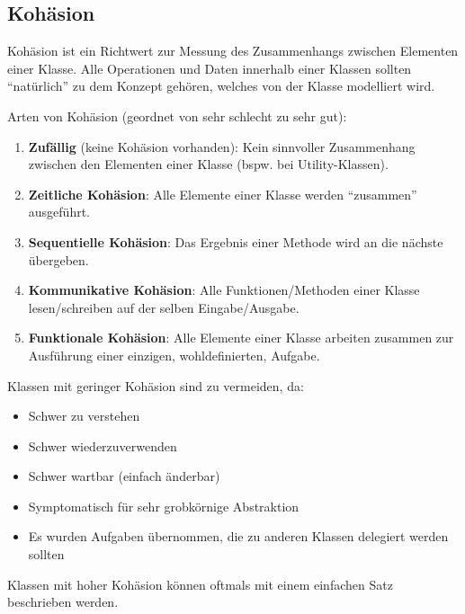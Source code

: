 

		\subsection{Kohäsion}
			Kohäsion ist ein Richtwert zur Messung des Zusammenhangs zwischen Elementen einer Klasse. Alle Operationen und Daten innerhalb einer Klassen sollten \enquote{natürlich} zu dem Konzept gehören, welches von der Klasse modelliert wird.

			Arten von Kohäsion (geordnet von sehr schlecht zu sehr gut):
			\begin{enumerate}
				\item \textbf{Zufällig} (keine Kohäsion vorhanden): Kein sinnvoller Zusammenhang zwischen den Elementen einer Klasse (bspw. bei Utility-Klassen).
				\item \textbf{Zeitliche Kohäsion}: Alle Elemente einer Klasse werden \enquote{zusammen} ausgeführt.
				\item \textbf{Sequentielle Kohäsion}: Das Ergebnis einer Methode wird an die nächste übergeben.
				\item \textbf{Kommunikative Kohäsion}: Alle Funktionen/Methoden einer Klasse lesen/schreiben auf der selben Eingabe/Ausgabe.
				\item \textbf{Funktionale Kohäsion}: Alle Elemente einer Klasse arbeiten zusammen zur Ausführung einer einzigen, wohldefinierten, Aufgabe.
			\end{enumerate}

			Klassen mit geringer Kohäsion sind zu vermeiden, da:
			\begin{itemize}
				\item Schwer zu verstehen
				\item Schwer wiederzuverwenden
				\item Schwer wartbar (einfach änderbar)
				\item Symptomatisch für sehr grobkörnige Abstraktion
				\item Es wurden Aufgaben übernommen, die zu anderen Klassen delegiert werden sollten
			\end{itemize}
			Klassen mit hoher Kohäsion können oftmals mit einem einfachen Satz beschrieben werden.

